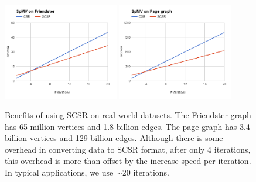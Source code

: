 \documentclass[simplex.tex]{subfiles}
\begin{document}
\begin{figure}[h!]
\begin{cframed}
\centering
\includegraphics[width=0.45\textwidth]{../../figs/SpMV-friendster.png}
\includegraphics[width=0.45\textwidth]{../../figs/SpMV-pagegraph.png}
\caption{
Benefits of using SCSR on real-world datasets. The Friendster graph has
65 million vertices and
1.8 billion edges. The page graph has 3.4 billion vertices and 129 billion
edges. Although there is some overhead in converting data to SCSR format,
after only 4 iterations, this overhead is more than offset by the increase
speed per iteration. In typical applications, we use $\sim 20$ iterations.
}
\label{fig:flashx1}
\end{cframed}
\end{figure}

\end{document}
